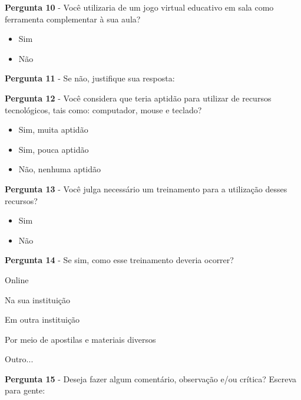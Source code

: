 \documentclass[article,12pt,openany,oneside,a4paper,english,brazil]{abntex2}
\begin{document}
\textbf{Pergunta 10} - Você utilizaria de um jogo virtual educativo em sala como ferramenta complementar à sua aula?
\begin{itemize}
     \item Sim
     \item Não
\end{itemize}

\textbf{Pergunta 11} - Se não, justifique sua resposta:

\textbf{Pergunta 12} - Você considera que teria aptidão para utilizar de recursos tecnológicos, tais como: computador, mouse e teclado?
\begin{itemize}
     \item Sim, muita aptidão
     \item Sim, pouca aptidão
     \item Não, nenhuma aptidão
\end{itemize}

\textbf{Pergunta 13} - Você julga necessário um treinamento para a utilização desses recursos?
\begin{itemize}
     \item Sim
     \item Não
\end{itemize}

\textbf{Pergunta 14} - Se sim, como esse treinamento deveria ocorrer?
\begin{todolist}
     \item Online
     \item Na sua instituição
     \item Em outra instituição
     \item Por meio de apostilas e materiais diversos
     \item Outro...
\end{todolist}

\textbf{Pergunta 15} - Deseja fazer algum comentário, observação e/ou crítica? Escreva para gente:
\end{document}
